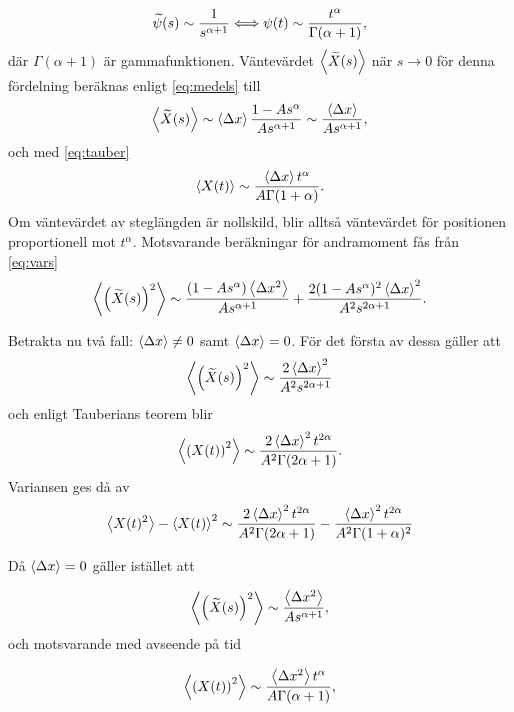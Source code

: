 \begin{equation}\label{eq:tauber}
   \widetilde{\psi} (s)\sim\frac{1}{s^{\alpha+1}}\Longleftrightarrow \psi(t)\sim\frac{t^{\alpha}}{\Gamma (\alpha+1)},
\end{equation}
där $\Gamma(\alpha+1)$ är gammafunktionen.
Väntevärdet $\ev{\Xs}$ när $s\to 0$ för denna fördelning beräknas enligt \eqref{eq:medels} till
\begin{equation}
    \ev{\Xs} \sim \ev{\Delta x}\frac{1-As^{\alpha}}{As^{\alpha+1}} \sim \frac{\ev{\Delta x}}{As^{\alpha+1}},
\end{equation}
och med \eqref{eq:tauber}
\begin{equation}
    \ev{X(t)} \sim \frac{\ev{\Delta x}t^{\alpha}}{A\Gamma (1+\alpha)}.
\end{equation}
Om väntevärdet av steglängden är nollskild, blir alltså väntevärdet för positionen proportionell mot $t^{\alpha}$. Motsvarande beräkningar för andramoment fås från \eqref{eq:vars}
\begin{equation}
   \ev{\left(\Xs\right)^2} \sim \frac{(1-As^{\alpha})\ev{\Delta x^2}}{As^{\alpha+1}}+\frac{2(1-As^{\alpha})^2\ev{\Delta x}^2}{A^2s^{2\alpha+1}}.
\end{equation}

Betrakta nu två fall: $\ev{\Delta x}\neq0$ samt $\ev{\Delta x}=0$. För det första av dessa gäller att
\begin{equation}
   \ev{\left(\Xs\right)^2} \sim \frac{2\ev{\Delta x}^2}{A^2s^{2\alpha+1}}
\end{equation}
och enligt Tauberians teorem blir
\begin{equation}
   \ev{\left(X(t)\right)^2} \sim \frac{2\ev{\Delta x}^2t^{2\alpha}}{A^2\Gamma (2\alpha+1)}.
\end{equation}
Variansen ges då av  
\begin{equation}
    \ev{X(t)^2}-\ev{X(t)}^2 \sim \frac{2\ev{\Delta x}^2t^{2\alpha}}{A^2\Gamma (2\alpha+1)}-\frac{\ev{\Delta x}^2t^{2\alpha}}{A^2\Gamma (1+\alpha)^2}
\end{equation}


Då $\ev{\Delta x}=0$ gäller istället att

\begin{equation}
   \ev{\left(\Xs\right)^2}\sim \frac{\ev{\Delta x^2}}{As^{\alpha+1}},
\end{equation}
och motsvarande med avseende på tid 

\begin{equation}
   \ev{\left(X(t)\right)^2} \sim \frac{\ev{\Delta x^2}t^{\alpha}}{A\Gamma (\alpha+1)},
\end{equation}

